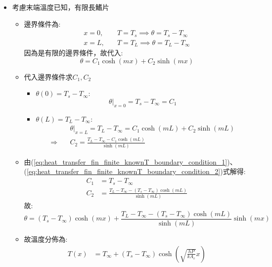 \documentclass[../main.tex]{subfiles}
\begin{document}
\begin{itemize}
\begin{itemize}
    \item 考慮末端溫度已知，有限長鰭片
    \begin{itemize}
      \item 邊界條件為:
      \begin{align}
        x=0,&\quad T=T_s \implies \theta = T_s - T_\infty \nonumber\\
        x=L,&\quad T=T_L \implies \theta = T_L - T_\infty
      \end{align}
      因為是有限的邊界條件，故代入:
      \begin{equation}
        \theta = C_1 \cosh(mx) + C_2 \sinh(mx)
      \end{equation}
      \item 代入邊界條件求$C_1, C_2$
      \begin{itemize}
        \item $\theta(0)=T_s - T_\infty$:
        \begin{equation}
          \theta|_{x=0} = T_s - T_\infty = C_1 \label{eq:heat_transfer_fin_finite_knownT_boundary_condition_1}
        \end{equation}
        \item $\theta(L)=T_L - T_\infty$:
        \begin{align}
          & \theta|_{x=L} = T_L - T_\infty = C_1 \cosh(mL) + C_2 \sinh(mL) \nonumber\\
          \Rightarrow\quad& C_2 = \frac{T_L - T_\infty - C_1 \cosh(mL)}{\sinh(mL)} \label{eq:heat_transfer_fin_finite_knownT_boundary_condition_2}
        \end{align}
      \end{itemize}
    \item 由(\ref{eq:heat_transfer_fin_finite_knownT_boundary_condition_1})、(\ref{eq:heat_transfer_fin_finite_knownT_boundary_condition_2})式解得:
    \begin{align}
      C_1 &= T_s - T_\infty \nonumber\\
      C_2 &= \frac{T_L - T_\infty - (T_s - T_\infty) \cosh(mL)}{\sinh(mL)}
    \end{align}
    故:
    \begin{equation}
      \theta = (T_s - T_\infty) \cosh(mx) + \frac{T_L - T_\infty - (T_s - T_\infty) \cosh(mL)}{\sinh(mL)} \sinh(mx)
    \end{equation}
    \item 故溫度分佈為:
    \begin{align}
      T(x) &= T_\infty + (T_s - T_\infty) \cosh\left(\sqrt{\frac{hP}{kA_c}}x\right) \nonumber\\

\end{align}
\end{itemize}
\end{itemize}
\end{itemize}
\end{document}
